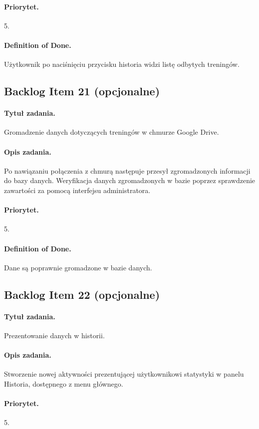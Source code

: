 \documentclass[a4paper]{article}
\begin{document}
\paragraph{Priorytet.} 5.
\paragraph{Definition of Done.} Użytkownik po naciśnięciu przycisku historia widzi listę odbytych treningów.

\subsection{Backlog Item 21 (opcjonalne)}
\paragraph{Tytuł zadania.} Gromadzenie danych dotyczących treningów w chmurze Google Drive.
\paragraph{Opis zadania.} Po nawiązaniu połączenia z chmurą następuje przesył zgromadzonych informacji do bazy danych. Weryfikacja danych zgromadzonych w bazie poprzez sprawdzenie zawartości za pomocą interfejsu administratora.
\paragraph{Priorytet.} 5.
\paragraph{Definition of Done.} Dane są poprawnie gromadzone w bazie danych.

\subsection{Backlog Item 22 (opcjonalne)}
\paragraph{Tytuł zadania.} Prezentowanie danych w historii.
\paragraph{Opis zadania.} Stworzenie nowej aktywności prezentującej użytkownikowi statystyki w panelu Historia, dostępnego z menu głównego.
\paragraph{Priorytet.} 5.
\end{document}
